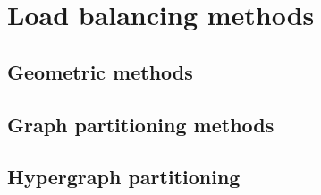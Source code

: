 %
%
\chapter{Load balancing methods}

\section{Geometric methods}

\section{Graph partitioning methods}

\section{Hypergraph partitioning}

